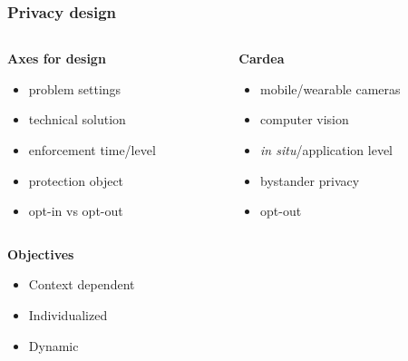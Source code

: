 \begin{frame}[t]
\frametitle{Privacy design}

\begin{columns}
  \begin{column}{0.5\textwidth}
    \begin{block}{\bf Axes for design}
      \begin{itemize}
          \item problem settings
          \item technical solution
          \item enforcement time/level
          \item protection object
          \item opt-in vs opt-out
      \end{itemize}
    \end{block}
  \end{column}\hfill
  \begin{column}{0.5\textwidth}
    \begin{block}{\bf Cardea}
      \begin{itemize}
          \item mobile/wearable cameras
          \item computer vision
          \item {\it in situ}/application level
          \item bystander privacy
          \item opt-out
      \end{itemize}
    \end{block}
  \end{column}
\end{columns}

\begin{block} {\bf Objectives}
    \begin{itemize}
        \item Context dependent
        \item Individualized
        \item Dynamic
    \end{itemize}
\end{block}




\end{frame}
